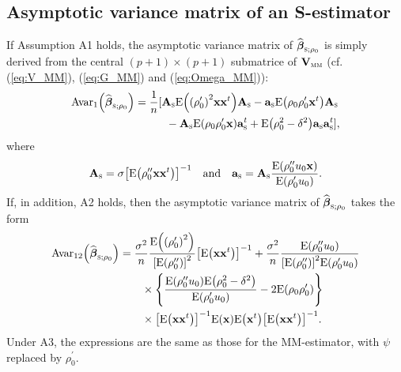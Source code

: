 \subsection{Asymptotic variance matrix of an S-estimator}

If Assumption A1 holds, the asymptotic variance matrix of $\widehat
{\boldsymbol\beta}_{\stsc{S};\rho_{0}}$ is simply derived from the central
$(p+1)\times(p+1)$ submatrice of $\mathbf{V}_{\stsc{MM}}$ (cf.
(\ref{eq:V_MM}), (\ref{eq:G_MM}) and (\ref{eq:Omega_MM})):
\begin{align*}
\mathrm{Avar}_{1}\left(  \sthat{\boldsymbol\beta}_{\stsc{S};\rho_{0}%
}\right)   &  =\frac{1}{n}[\mathbf{A}_{\stsc{S}}\mathrm{E}\left(  \left(
\rho_{0}^{\prime}\right)  ^{2}\mathbf{xx}^{t}\right)  \mathbf{A}_{\stsc{S}%
}-\mathbf{a}_{\stsc{S}}\mathrm{E}\left(  \rho_{0}\rho_{0}^{\prime}%
\stvec{x}^{t}\right)  \mathbf{A}_{\stsc{S}}\\
&  \hspace{1cm}-\mathbf{A}_{\stsc{S}}\mathrm{E}\left(  \rho_{0}\rho
_{0}^{\prime}\stvec{x}\right)  \mathbf{a}_{\stsc{S}}^{t}+\mathrm{E}\left(
\rho_{0}^{2}-\delta^{2}\right)  \mathbf{a}_{\stsc{S}}\mathbf{a}_{\stsc{S}%
}^{t}],
\end{align*}
where
\[
\mathbf{A}_{\stsc{S}}=\sigma\left[  \mathrm{E}\left(  \rho_{0}^{\prime
\prime}\mathbf{xx}^{t}\right)  \right]  ^{-1}\quad\text{and\quad}%
\mathbf{a}_{\stsc{S}}=\mathbf{A}_{\stsc{S}}\frac{\mathrm{E}\left(
\rho_{0}^{\prime\prime}u_{0}\stvec{x}\right)  }{\mathrm{E}\left(  \rho
_{0}^{\prime}u_{0}\right)  }.
\]
If, in addition, A2 holds, then the asymptotic variance matrix of
$\sthat{\boldsymbol\beta}_{\stsc{S};\rho_{0}}$ takes the form
\begin{align*}
\mathrm{Avar}_{12}\left(  \sthat{\boldsymbol\beta}_{\stsc{S};\rho_{0}%
}\right)   &  =\frac{\sigma^{2}}{n}\frac{\mathrm{E}\left(  \left(  \rho
_{0}^{\prime}\right)  ^{2}\right)  }{\left[  \mathrm{E}\left(  \rho
_{0}^{\prime\prime}\right)  \right]  ^{2}}\left[  \mathrm{E}\left(
\mathbf{xx}^{t}\right)  \right]  ^{-1}+\frac{\sigma^{2}}{n}\frac
{\mathrm{E}\left(  \rho_{0}^{\prime\prime}u_{0}\right)  }{\left[
\mathrm{E}\left(  \rho_{0}^{\prime\prime}\right)  \right]  ^{2}\mathrm{E}%
\left(  \rho_{0}^{\prime}u_{0}\right)  }\\
&  \qquad\times\left\{  \frac{\mathrm{E}\left(  \rho_{0}^{\prime\prime}%
u_{0}\right)  \mathrm{E}\left(  \rho_{0}^{2}-\delta^{2}\right)  }%
{\mathrm{E}\left(  \rho_{0}^{\prime}u_{0}\right)  }-2\mathrm{E}\left(
\rho_{0}\rho_{0}^{\prime}\right)  \right\} \\
&  \qquad\times\left[  \mathrm{E}\left(  \mathbf{xx}^{t}\right)  \right]
^{-1}\mathrm{E}\left(  \stvec{x}\right)  \mathrm{E}\left(  \stvec{x}%
^{t}\right)  \left[  \mathrm{E}\left(  \mathbf{xx}^{t}\right)  \right]  ^{-1}.
\end{align*}
Under A3, the expressions are the same as those for the MM-estimator, with
$\psi$ replaced by $\rho_{0}^{\prime}$.

